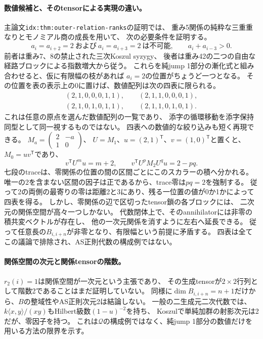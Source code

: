 \documentclass[11pt,a4paper]{ltjsarticle}
\begin{document}
\paragraph{数値候補と、そのtensorによる実現の違い。}
主論文\texttt{idx:thm:outer-relation-ranks}の証明では、
重み5関係の純粋な三重重なりとモノミアル商の成長を用いて、
次の必要条件を証明する。
\[
a_i=a_{i+2}=2\ \text{および}\ a_i=a_{i+3}=2\ \text{は不可能},
\qquad a_i+a_{i-3}>0.
\]
前者は重み7、8の禁止された三次Koszul syzygy、
後者は重み42の二つの自由な経路ブロックによる指数増大から従う。
これらを純jump 1部分の漸化式と組み合わせると、仮に有限幅の枝があれば
$a_i=2$の位置がちょうど一つとなる。
その位置を表の表示上の$0$に置けば、数値配列は次の四表に限られる。
\[
\begin{gathered}
(2,1,0,0,0,1,1),\qquad (2,1,1,0,0,0,1),\\
(2,1,0,1,0,1,1),\qquad (2,1,1,0,1,0,1).
\end{gathered}
\]
これは任意の原点を選んだ数値配列の一覧であり、
添字の循環移動を添字保持同型として同一視するものではない。
四表への数値的な絞り込みも短く再現できる。
$M_a=\left(\begin{smallmatrix}2&-a\\1&0\end{smallmatrix}\right)$、
$U=M_1$、$u=(2,1)^{\mathsf T}$、$v=(1,0)^{\mathsf T}$と置くと、
$M_0=uv^{\mathsf T}$であり、
\[
v^{\mathsf T}U^m u=m+2,\qquad
v^{\mathsf T}U^pM_2U^q u=2-pq.
\]
七段のtraceは、零関係の位置の間の区間ごとにこのスカラーの積へ分かれる。
唯一の2を含まない区間の因子は正であるから、trace零は$pq=2$を強制する。
従って2の両側の最寄りの零は距離2と3にあり、残る一位置の値が0か1かによって四表を得る。
しかし、零関係の辺で区切ったtensor鎖の各ブロックには、
二次元の関係空間が高々一つしかない。
代数閉体上で、そのannihilatorには非零の積共変ベクトルが存在し、
他の一次元関係を消すように左右へ延長できる。
従って任意長の$B_{i,i+n}$が非零となり、有限幅という前提に矛盾する。
四表は全てこの議論で排除され、AS正則代数の構成例ではない。

\paragraph{関係空間の次元と関係tensorの階数。}
$r_2(i)=1$は関係空間が一次元という主張であり、
その生成tensorが$2\times2$行列として階数2であることはまだ証明していない。
同様に$\dim B_{i,i+n}=n+1$だけから、$B$の整域性やAS正則次元2は結論しない。
一般の二生成元二次代数では、$k\langle x,y\rangle/(xy)$もHilbert級数$(1-u)^{-2}$を持ち、
Koszulで単純加群の射影次元は2だが、零因子を持つ。
これは$\mathcal Q$の構成例ではなく、純jump 1部分の数値だけを用いる方法の限界を示す。
\end{document}
